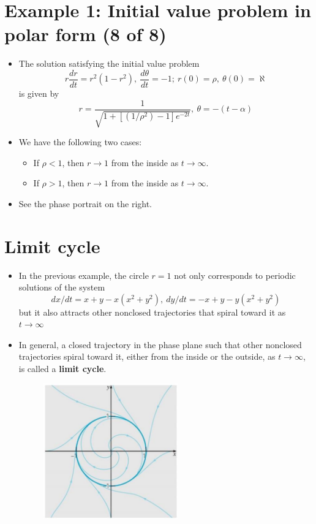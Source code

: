 \documentclass[11pt,a4paper]{article}
\begin{document}
	\section*{Example 1: Initial value problem in polar form (8 of 8)}
	\begin{itemize}
		\item The solution satisfying the initial value problem
		$$
		r\frac{dr}{dt} = r^2(1-r^2),\ \frac{d\theta}{dt} = -1;\ r(0) = \rho,\ \theta(0) = \aleph
		$$
		is given by
		$$
		r = \frac{1}{\sqrt{1 + [(1/\rho^2)-1]e^{-2t}}},\ \theta = -(t-\alpha)
		$$
		\item We have the following two cases:
		\begin{itemize}
			\item[\labelitemi] If $\rho < 1$, then $r \to 1$ from the inside as $t \to \infty$.
			\item[\labelitemi] If $\rho > 1$, then $r \to 1$ from the inside as $t \to \infty$.
		\end{itemize}
		\item See the phase portrait on the right.
	\end{itemize}
	\section*{Limit cycle}
	\begin{itemize}
		\item In the previous example, the circle $r = 1$ not only corresponds to periodic solutions of the system
		$$
		dx/dt = x+y-x(x^2+y^2),\ dy/dt = -x+y-y(x^2+y^2)
		$$
		but it also attracts other nonclosed trajectories that spiral toward it as $t \to \infty$
		\item In general, a closed trajectory in the phase plane such that other nonclosed trajectories spiral toward it, either from the inside or the outside, as $t \to \infty$, is called a \textbf{limit cycle}.
		\begin{figure}[H]
			\centering
			\includegraphics[width=0.55\textwidth]{figure/Lec19f5.PNG}
		\end{figure}
	\end{itemize}
\end{document}
